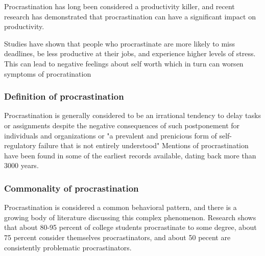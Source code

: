 

Procrastination has long been considered a productivity killer,
and recent research has demonstrated that procrastination can have a significant impact on productivity.  %

Studies have shown that people who procrastinate are more likely to miss deadlines, be less productive at their jobs, and experience higher levels of stress. This can lead to negative feelings about self worth which in turn can worsen symptoms of procratination %


\subsubsection{Definition of procrastination}
Procrastination is generally considered to be an irrational
tendency to delay tasks or assignments despite the negative
consequences of such postponement for individuals and organizations\cite{hen2018causes}  \cite{lay1986last} or "a prevalent and prenicious form of self-regulatory failure that is not entirely understood"
Mentions of procrastination have been found in some of the earliest records available, dating back more than 3000 years. \cite{Piers2007}


\subsubsection{Commonality of procrastination}
Procrastination is considered a common behavioral pattern,
and there is a growing body of literature discussing this complex phenomenon.\cite{Yan2022}
Research shows that about 80-95 percent of college students procrastinate to some degree, about 75
percent consider themselves  procrastinators, and about 50 pecent are consistently problematic procrastinators. \cite{Steel2007}

